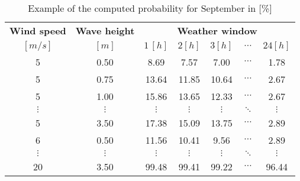 \begin{table}
\label{tab:proba}
\begin{tabular}{ccccccc}
\hline
{\bf Wind speed} & {\bf Wave height} & \multicolumn{ 5}{c}{{\bf Weather window}} \\
$[m/s]$      &      $[m]$      &          $1\, [h]$ &          $2 [h]$ &          $3 [h]$ &  $\cdots$ &         $24 [h]$ \\
\hline
5 &       0.50 &       8.69 &       7.57 &       7.00 &  $\cdots$ &       1.78 \\
5 &       0.75 &      13.64 &      11.85 &      10.64 &  $\cdots$ &       2.67 \\
5 &       1.00 &      15.86 &      13.65 &      12.33 &  $\cdots$ &       2.67 \\
 $\vdots$ &  $\vdots$ &  $\vdots$ &  $\vdots$ &  $\vdots$ &  $\ddots$ &  $\vdots$ \\
5 &       3.50 &      17.38 &      15.09 &      13.75 &  $\cdots$ &       2.89 \\
6 &       0.50 &      11.56 &      10.41 &       9.56 &  $\cdots$ &       2.89 \\
 $\vdots$ &  $\vdots$ &  $\vdots$ &  $\vdots$ &  $\vdots$ & $\ddots$           &  $\vdots$ \\
20 &       3.50 &      99.48 &      99.41 &      99.22 &  $\cdots$ &      96.44 \\
\hline
\end{tabular}  

\caption{Example of the computed probability for September in [\%]}
\end{table}